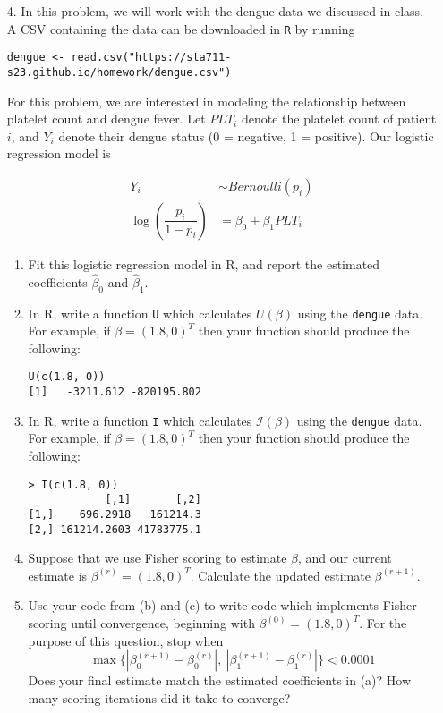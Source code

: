\documentclass[11pt]{article}
\begin{document}
\begin{enumerate}

\item[4.] In this problem, we will work with the dengue data we discussed in class. A CSV containing the data can be downloaded in \texttt{R} by running
\begin{center}
\texttt{dengue <- read.csv("https://sta711-s23.github.io/homework/dengue.csv")}
\end{center}

For this problem, we are interested in modeling the relationship between platelet count and dengue fever. Let $PLT_i$ denote the platelet count of patient $i$, and $Y_i$ denote their dengue status (0 = negative, 1 = positive). Our logistic regression model is

\begin{align*}
Y_i &\sim Bernoulli(p_i)\\
\log \left( \dfrac{p_i}{1 - p_i} \right) &= \beta_0 + \beta_1 PLT_i
\end{align*}

\begin{enumerate}
\item Fit this logistic regression model in R, and report the estimated coefficients $\widehat{\beta}_0$ and $\widehat{\beta}_1$.
\item In R, write a function \texttt{U} which calculates $U(\beta)$ using the \texttt{dengue} data. For example, if $\beta = (1.8, 0)^T$ then your function should produce the following:

\begin{verbatim}
U(c(1.8, 0))
[1]   -3211.612 -820195.802
\end{verbatim}

\item In R, write a function \texttt{I} which calculates $\mathcal{I}(\beta)$ using the \texttt{dengue} data. For example, if $\beta = (1.8, 0)^T$ then your function should produce the following:

\begin{verbatim}
> I(c(1.8, 0))
            [,1]       [,2]
[1,]    696.2918   161214.3
[2,] 161214.2603 41783775.1
\end{verbatim}

\item Suppose that we use Fisher scoring to estimate $\beta$, and our current estimate is $\beta^{(r)} = (1.8, 0)^T$. Calculate the updated estimate $\beta^{(r+1)}$.

\item Use your code from (b) and (c) to write code which implements Fisher scoring until convergence, beginning with $\beta^{(0)} = (1.8, 0)^T$. For the purpose of this question, stop when 
$$\max \{ |\beta_0^{(r+1)} - \beta_0^{(r)}|, \ |\beta_1^{(r+1)} - \beta_1^{(r)}| \} < 0.0001$$
Does your final estimate match the estimated coefficients in (a)? How many scoring iterations did it take to converge?


\end{enumerate}
\end{enumerate}
\end{document}
